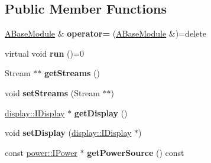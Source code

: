 \subsection*{Public Member Functions}
\begin{DoxyCompactItemize}
\item 
\mbox{\label{classwood_box_1_1module_1_1_a_base_module_a61e8f78a69b3ea735e70a13f6de8d662}} 
\mbox{\hyperlink{classwood_box_1_1module_1_1_a_base_module}{A\+Base\+Module}} \& {\bfseries operator=} (\mbox{\hyperlink{classwood_box_1_1module_1_1_a_base_module}{A\+Base\+Module}} \&)=delete
\item 
\mbox{\label{classwood_box_1_1module_1_1_a_base_module_af1a4bde27dc757a4698f70d9773beddc}} 
virtual void {\bfseries run} ()=0
\item 
\mbox{\label{classwood_box_1_1module_1_1_a_base_module_ada9df5e73cb0aee0bada1de17de19a9c}} 
Stream $\ast$$\ast$ {\bfseries get\+Streams} ()
\item 
\mbox{\label{classwood_box_1_1module_1_1_a_base_module_a6e3b73bd36f668f5d621dee3070c131a}} 
void {\bfseries set\+Streams} (Stream $\ast$$\ast$)
\item 
\mbox{\label{classwood_box_1_1module_1_1_a_base_module_afecd89a2ed85517a6d72ad2f03ea87c3}} 
\mbox{\hyperlink{classwood_box_1_1display_1_1_i_display}{display\+::\+I\+Display}} $\ast$ {\bfseries get\+Display} ()
\item 
\mbox{\label{classwood_box_1_1module_1_1_a_base_module_a7e99b7d8d59953a8350e9859a475bc6a}} 
void {\bfseries set\+Display} (\mbox{\hyperlink{classwood_box_1_1display_1_1_i_display}{display\+::\+I\+Display}} $\ast$)
\item 
\mbox{\label{classwood_box_1_1module_1_1_a_base_module_a6a0c195b7c497201926f6d07b77f6489}} 
const \mbox{\hyperlink{classwood_box_1_1power_1_1_i_power}{power\+::\+I\+Power}} $\ast$ {\bfseries get\+Power\+Source} () const
\item 

\end{DoxyCompactItemize}
